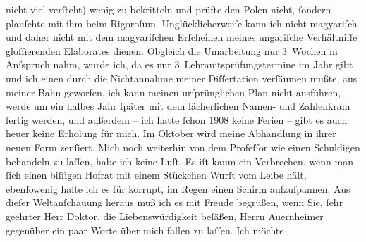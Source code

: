 \begin{ledgroupsized}[t]{13cm}
               nicht viel verſteht) wenig zu bekritteln und prüfte den Polen nicht, ſondern plauſchte mit ihm beim
               Rigoroſum. Unglücklicherweiſe kann ich nicht magyariſch und daher nicht mit dem magyariſchen Erſcheinen meines ungariſche Verhältniſſe gloſſierenden Elaborates dienen.\pend
           \pstart
           Obgleich die Umarbeitung nur 3 Wochen in Anſspruch nahm, wurde ich, da es nur
               3 Lehramtsprüfungstermine im Jahr gibt und ich einen durch die Nichtannahme meiner
               Diſſertation verſäumen mußte, aus meiner Bahn geworfen, ich kann meinen
               urſprünglichen Plan nicht ausführen, werde um ein halbes Jahr ſpäter mit dem
               lächerlichen Namen- und Zahlenkram fertig werden, und außerdem – ich hatte ſchon
                  1908 keine Ferien – gibt es auch heuer keine Erholung für mich. Im
                  Oktober wird meine Abhandlung in ihrer neuen Form zenſiert. Mich noch weiterhin von dem Profeſſor wie einen
               Schuldigen behandeln zu laſſen, habe ich keine Luſt. Es iſt kaum ein Verbrechen, wenn
               man ſich einen biſſigen Hofrat mit einem Stückchen Wurſt vom Leibe hält, ebenſowenig
               halte ich es für korrupt, im Regen einen Schirm aufzuſpannen. Aus dieſer
               Weltanſchauung heraus muß ich es mit Freude begrüßen, wenn Sie, ſehr geehrter Herr
               Doktor, die Liebenswürdigkeit beſäßen, Herrn Auernheimer gegenüber ein paar Worte über mich fallen zu laſſen. Ich möchte

\end{ledgroupsized}
